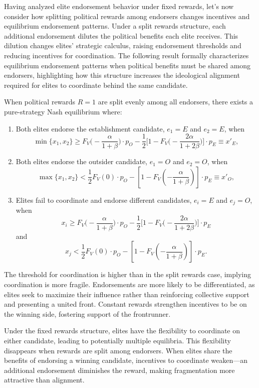 Having analyzed elite endorsement behavior under fixed rewards, let's now consider how splitting political rewards among endorsers changes incentives and equilibrium endorsement patterns. Under a split rewards structure, each additional endorsement dilutes the political benefits each elite receives. This dilution changes elites' strategic calculus, raising endorsement thresholds and reducing incentives for coordination. The following result formally characterizes equilibrium endorsement patterns when political benefits must be shared among endorsers, highlighting how this structure increases the ideological alignment required for elites to coordinate behind the same candidate.

\begin{result}
When political rewards $R=1$ are split evenly among all endorsers, there exists a pure-strategy Nash equilibrium where:
\begin{enumerate}
    \item Both elites endorse the establishment candidate, $e_1 = E$ and $e_2 = E$, when 
    \[\min\{x_1,x_2\} \geq F_V\bigg(-\frac{\alpha}{1+\beta}\bigg)\cdot p_O - \frac{1}{2}\bigg[1- F_V\bigg(-\frac{2\alpha}{1+2\beta}\bigg)\bigg]\cdot p_E \equiv x'_E,\]

    \item Both elites endorse the outsider candidate, $e_1 = O$ and $e_2 = O$, when 
    \[\max\{x_1,x_2\} < \frac{1}{2} F_V(0)\cdot p_O - \left[1- F_V\left(-\frac{\alpha}{1+\beta}\right)\right]\cdot p_E \equiv x'_O,\]

    \item Elites fail to coordinate and endorse different candidates, $e_i = E$ and $e_j = O$, when
    \[x_i \geq F_V\bigg(-\frac{\alpha}{1+\beta}\bigg)\cdot p_O - \frac{1}{2}\bigg[1- F_V\bigg(-\frac{2\alpha}{1+2\beta}\bigg)\bigg]\cdot p_E\] 
    and 
    \[x_j < \frac{1}{2} F_V(0)\cdot p_O - \left[1- F_V\left(-\frac{\alpha}{1+\beta}\right)\right]\cdot p_E.\]  
\end{enumerate}
\end{result}

The threshold for coordination is higher than in the split rewards case, implying coordination is more fragile. Endorsements are more likely to be differentiated, as elites seek to maximize their influence rather than reinforcing collective support and presenting a united front. Constant rewards strengthen incentives to be on the winning side, fostering support of the frontrunner.

Under the fixed rewards structure, elites have the flexibility to coordinate on either candidate, leading to potentially multiple equilibria. This flexibility disappears when rewards are split among endorsers. When elites share the benefits of endorsing a winning candidate, incentives to coordinate weaken—an additional endorsement diminishes the reward, making fragmentation more attractive than alignment.

